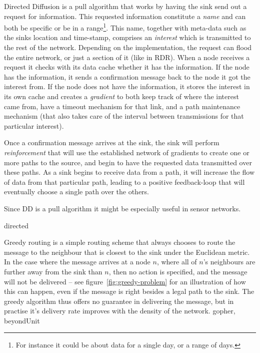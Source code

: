 \begin{description}
{Directed Diffusion is a pull algorithm that works by having the sink send out a request for information. This requested information constitute a \emph{name} and can both be specific or be in a range\footnote{For instance it could be about data for a single day, or a range of days.}. This name, together with meta-data such as the sinks location and time-stamp, comprises an \emph{interest} which is transmitted to the rest of the network. Depending on the implementation, the request can flood the entire network, or just a section of it (like in RDR). When a node receives a request it checks with its data cache whether it has the information. If the node has the information, it sends a confirmation message back to the node it got the interest from. If the node does not have the information, it stores the interest in its own cache and creates a \emph{gradient} to both keep track of where the interest came from, have a timeout mechanism for that link, and a path maintenance mechanism (that also takes care of the interval between transmissions for that particular interest). 

Once a confirmation message arrives at the sink, the sink will perform \emph{reinforcement} that will use the established network of gradients to create one or more paths to the source, and begin to have the requested data transmitted over these paths. As a sink begins to receive data from a path, it will increase the flow of data from that particular path, leading to a positive feedback-loop that will eventually choose a single path over the others.

Since DD is a pull algorithm it might be especially useful in sensor networks.}
{directed}


{\label{section:greedy}Greedy routing is a simple routing scheme that always chooses to route the message to the neighbour that is closest to the sink under the Euclidean metric. In the case where the message arrives at a node $n$, where all of $n$'s neighbours are further away from the sink than $n$, then no action is specified, and the message will not be delivered -- see figure~\ref{fig:greedy-problem} for an illustration of how this can happen, even if the message is right besides a legal path to the sink. The greedy algorithm thus offers no guarantee in delivering the message, but in practise it's delivery rate improves with the density of the network.}
{gopher, beyondUnit}


\end{description}
